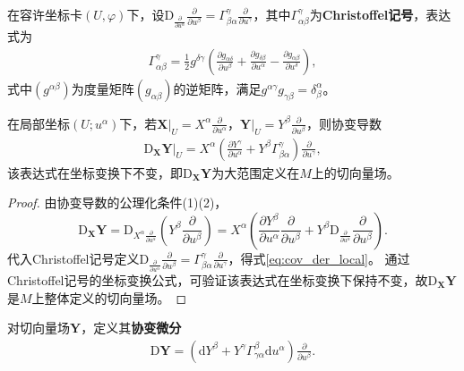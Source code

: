 \documentclass[../../main.tex]{subfiles}%
\begin{document}
\begin{definition}
在容许坐标卡$(U,\varphi)$下，设$\mathrm{D}_{\frac{\partial}{\partial u^\alpha}}\frac{\partial}{\partial u^\beta}=\Gamma_{\beta\alpha}^\gamma\frac{\partial}{\partial u^\gamma}$，其中$\Gamma_{\alpha\beta}^\gamma$为\textbf{Christoffel记号}，表达式为
\begin{align}
\Gamma_{\alpha\beta}^\gamma=\frac{1}{2}g^{\delta\gamma}\left(\frac{\partial g_{\alpha\delta}}{\partial u^\beta}+\frac{\partial g_{\delta\beta}}{\partial u^\alpha}-\frac{\partial g_{\alpha\beta}}{\partial u^\delta}\right),\label{eq:::IO235322JIOWAIJ2.}
\end{align}
式中$(g^{\alpha\beta})$为度量矩阵$(g_{\alpha\beta})$的逆矩阵，满足$g^{\alpha\gamma}g_{\gamma\beta}=\delta_\beta^\alpha$。
\end{definition}

\begin{theorem}
在局部坐标$(U;u^\alpha)$下，若$\boldsymbol{X}|_U=X^\alpha\frac{\partial}{\partial u^\alpha}$，$\boldsymbol{Y}|_U=Y^\beta\frac{\partial}{\partial u^\beta}$，则协变导数
\begin{align}
\mathrm{D}_{\boldsymbol{X}}\boldsymbol{Y}|_U=X^\alpha\left(\frac{\partial Y^\gamma}{\partial u^\alpha}+Y^\beta\Gamma_{\beta\alpha}^\gamma\right)\frac{\partial}{\partial u^\gamma},\label{eq:cov_der_local}
\end{align}
该表达式在坐标变换下不变，即$\mathrm{D}_{\boldsymbol{X}}\boldsymbol{Y}$为大范围定义在$M$上的切向量场。
\end{theorem}

\begin{proof}

由协变导数的公理化条件(1)(2)，
\[
\mathrm{D}_{\boldsymbol{X}}\boldsymbol{Y}=\mathrm{D}_{X^\alpha\frac{\partial}{\partial u^\alpha}}\left(Y^\beta\frac{\partial}{\partial u^\beta}\right)=X^\alpha\left(\frac{\partial Y^\beta}{\partial u^\alpha}\frac{\partial}{\partial u^\beta}+Y^\beta\mathrm{D}_{\frac{\partial}{\partial u^\alpha}}\frac{\partial}{\partial u^\beta}\right).
\]
代入Christoffel记号定义$\mathrm{D}_{\frac{\partial}{\partial u^\alpha}}\frac{\partial}{\partial u^\beta}=\Gamma_{\beta\alpha}^\gamma\frac{\partial}{\partial u^\gamma}$，得式\eqref{eq:cov_der_local}。
通过Christoffel记号的坐标变换公式，可验证该表达式在坐标变换下保持不变，故$\mathrm{D}_{\boldsymbol{X}}\boldsymbol{Y}$是$M$上整体定义的切向量场。

\end{proof}

\begin{definition}
对切向量场$\boldsymbol{Y}$，定义其\textbf{协变微分}
\begin{align}
\mathrm{D}\boldsymbol{Y}=\left(\mathrm{d}Y^\beta+Y^\gamma\Gamma_{\gamma\alpha}^\beta\mathrm{d}u^\alpha\right)\frac{\partial}{\partial u^\beta}.\label{eq:cov_diff_abstract}
\end{align}
\end{definition}
\end{document}
